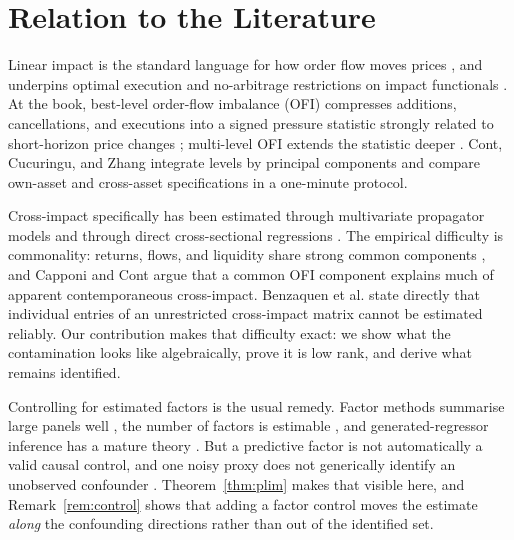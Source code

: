 \documentclass[10pt,twocolumn]{article}
\theoremstyle{remark}
\begin{document}
\section{Relation to the Literature}

Linear impact is the standard language for how order flow moves prices
\cite{Kyle1985,Hasbrouck1991}, and underpins optimal execution
\cite{AlmgrenChriss2001,ObizhaevaWang2013} and no-arbitrage restrictions on
impact functionals \cite{Gatheral2010,SchneiderLillo2019}. At the book,
best-level order-flow imbalance (OFI) compresses additions, cancellations, and
executions into a signed pressure statistic strongly related to short-horizon
price changes \cite{ContKukanovStoikov2014}; multi-level OFI extends the
statistic deeper \cite{XuGouldHowison2019}. Cont, Cucuringu, and Zhang
\cite{ContCucuringuZhang2023} integrate levels by principal components and
compare own-asset and cross-asset specifications in a one-minute protocol.

Cross-impact specifically has been estimated through multivariate propagator
models \cite{BenzaquenEtAl2017} and through direct cross-sectional regressions
\cite{CapponiCont2020}. The empirical difficulty is commonality: returns,
flows, and liquidity share strong common components
\cite{HasbrouckSeppi2001,ChordiaRollSubrahmanyam2000,KorajczykSadka2008,KarolyiLeeVanDijk2012},
and Capponi and Cont \cite{CapponiCont2020} argue that a common OFI component
explains much of apparent contemporaneous cross-impact. Benzaquen et al.
\cite{BenzaquenEtAl2017} state directly that individual entries of an
unrestricted cross-impact matrix cannot be estimated reliably. Our
contribution makes that difficulty exact: we show what the contamination looks
like algebraically, prove it is low rank, and derive what remains identified.

Controlling for estimated factors is the usual remedy. Factor methods summarise
large panels well \cite{StockWatson2002,ChamberlainRothschild1983}, the number
of factors is estimable \cite{BaiNg2002,Onatski2010,AhnHorenstein2013}, and
generated-regressor inference has a mature theory \cite{Bai2003,BaiNg2006}. But
a predictive factor is not automatically a valid causal control, and one noisy
proxy does not generically identify an unobserved confounder
\cite{MiaoEtAl2018}. Theorem~\ref{thm:plim} makes that visible here, and
Remark~\ref{rem:control} shows that adding a factor control moves the estimate
\emph{along} the confounding directions rather than out of the identified set.
\end{document}
